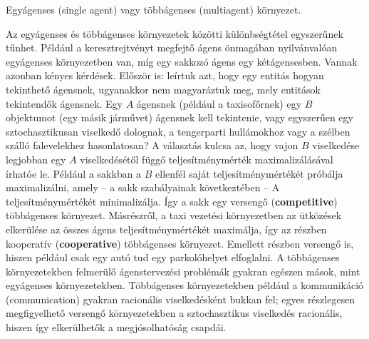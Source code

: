 \begin{definicio}
    Egyágenses (single agent) vagy többágenses (multiagent) környezet.

    Az egyágenses és többágenses környezetek közötti különbségtétel egyszerűnek
    tűnhet. Például a keresztrejtvényt megfejtő ágens önmagában nyilvánvalóan
    egyágenses környezetben van, míg egy sakkozó ágens egy kétágensesben.
    Vannak azonban kényes kérdések. Először is: leírtuk azt, hogy egy entitás
    hogyan tekinthető ágensnek, ugyanakkor nem magyaráztuk meg, mely entitások
    tekintendők ágensnek. Egy $A$ ágensnek (például a taxisofőrnek) egy $B$
    objektumot (egy másik járművet) ágensnek kell tekintenie, vagy egyszerűen
    egy sztochasztikusan viselkedő dolognak, a tengerparti hullámokhoz vagy a
    szélben szálló falevelekhez hasonlatosan? A választás kulcsa az, hogy vajon
    $B$ viselkedése legjobban egy $A$ viselkedésétől függő teljesítménymérték
    maximalizálásával írhatóe le. Például a sakkban a $B$ ellenfél saját
    teljesítménymértékét próbálja maximalizálni, amely – a sakk szabályainak
    következtében – A teljesítménymértékét minimalizálja. Így a sakk egy
    versengő (\textbf{competitive}) többágenses környezet. Másrészről, a taxi
    vezetési környezetben az ütközések elkerülése az összes ágens
    teljesítménymértékét maximálja, így az részben kooperatív
    (\textbf{cooperative}) többágenses környezet.  Emellett részben versengő
    is, hiszen például csak egy autó tud egy parkolóhelyet elfoglalni. A
    többágenses környezetekben felmerülő ágenstervezési problémák gyakran
    egészen mások, mint egyágenses környezetekben. Többágenses környezetekben
    például a kommunikáció (communication) gyakran racionális viselkedésként
    bukkan fel; egyes részlegesen megfigyelhető versengő környezetekben a
    sztochasztikus viselkedés racionális, hiszen így elkerülhetők a
    megjósolhatóság csapdái.
\end{definicio}
